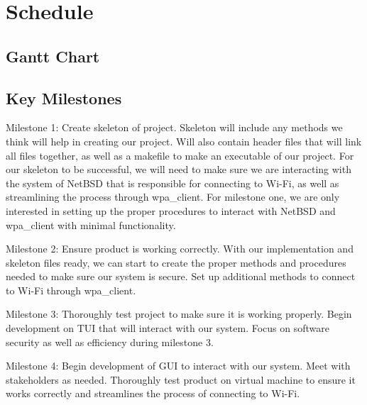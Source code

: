 \section{Schedule}

\subsection{Gantt Chart}

\subsection{Key Milestones}

Milestone 1: Create skeleton of project. Skeleton will include any methods we think will help in creating our project. Will also contain header 
files that will link all files together, as well as a makefile to make an executable of our project. For our skeleton to be successful, we will 
need to make sure we are interacting with the system of NetBSD that is responsible for connecting to Wi-Fi, as well as streamlining the process 
through wpa\_client. For milestone one, we are only interested in setting up the proper procedures to interact with NetBSD and wpa\_client with minimal 
functionality. 

Milestone 2: Ensure product is working correctly. With our implementation and skeleton files ready, we can start to create the proper methods and procedures 
needed to make sure our system is secure. Set up additional methods to connect to Wi-Fi through wpa\_client. 

Milestone 3: Thoroughly test project to make sure it is working properly. Begin development on TUI that will interact with our system. Focus on software security 
as well as efficiency during milestone 3. 

Milestone 4: Begin development of GUI to interact with our system. Meet with stakeholders as needed. Thoroughly test product on virtual machine to ensure it works 
correctly and streamlines the process of connecting to Wi-Fi. 

